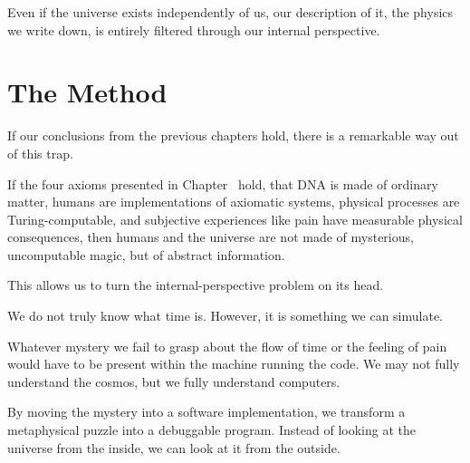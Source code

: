 Even if the universe exists independently of us, our description of it, the physics we write down, is entirely filtered through our internal perspective.



\section{The Method}

If our conclusions from the previous chapters hold, there is a remarkable way out of this trap.

If the four axioms presented in Chapter~ hold, that DNA is made of ordinary matter, humans are implementations of axiomatic systems, 
physical processes are Turing-computable, and subjective experiences like pain have measurable physical consequences, 
then humans and the universe are not made of mysterious, uncomputable magic, but of abstract information.

This allows us to turn the internal-perspective problem on its head.

We do not truly know what time is. However, it is something we can simulate.

Whatever mystery we fail to grasp about the flow of time or the feeling of pain would have to be present within the machine running the code.
We may not fully understand the cosmos, but we fully understand computers.

By moving the mystery into a software implementation, we transform a metaphysical puzzle into a debuggable program.
Instead of looking at the universe from the inside, we can look at it from the outside.

